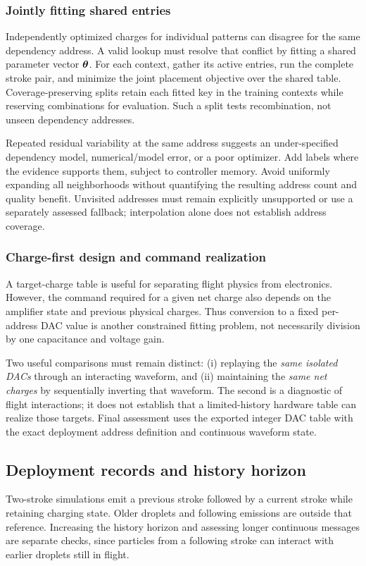\subsubsection{Jointly fitting shared entries}
Independently optimized charges for individual patterns can disagree for the same dependency address. A valid lookup must resolve that conflict by fitting a shared parameter vector $\boldsymbol{\theta}$. For each context, gather its active entries, run the complete stroke pair, and minimize the joint placement objective over the shared table. Coverage-preserving splits retain each fitted key in the training contexts while reserving combinations for evaluation. Such a split tests recombination, not unseen dependency addresses.

Repeated residual variability at the same address suggests an under-specified dependency model, numerical/model error, or a poor optimizer. Add labels where the evidence supports them, subject to controller memory. Avoid uniformly expanding all neighborhoods without quantifying the resulting address count and quality benefit. Unvisited addresses must remain explicitly unsupported or use a separately assessed fallback; interpolation alone does not establish address coverage.

\subsubsection{Charge-first design and command realization}
A target-charge table is useful for separating flight physics from electronics. However, the command required for a given net charge also depends on the amplifier state and previous physical charges. Thus conversion to a fixed per-address DAC value is another constrained fitting problem, not necessarily division by one capacitance and voltage gain.

Two useful comparisons must remain distinct: (i) replaying the \emph{same isolated DACs} through an interacting waveform, and (ii) maintaining the \emph{same net charges} by sequentially inverting that waveform. The second is a diagnostic of flight interactions; it does not establish that a limited-history hardware table can realize those targets. Final assessment uses the exported integer DAC table with the exact deployment address definition and continuous waveform state.

\subsection{Deployment records and history horizon}
Two-stroke simulations emit a previous stroke followed by a current stroke while retaining charging state. Older droplets and following emissions are outside that reference. Increasing the history horizon and assessing longer continuous messages are separate checks, since particles from a following stroke can interact with earlier droplets still in flight.

